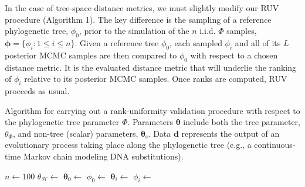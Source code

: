 \documentclass[oneside]{article}
\begin{document}
In the case of tree-space distance metrics, we must slightly modify our RUV procedure (Algorithm 1).
The key difference is the sampling of a reference phylogenetic tree, $\phi_0$, prior to the simulation of the $n$ i.i.d. $\Phi$ samples, $\boldsymbol{\phi}=\{\phi_i: 1 \leq i \leq n\}$.
Given a reference tree $\phi_0$, each sampled $\phi_i$ and all of its $L$ posterior MCMC samples are then compared to $\phi_0$ with respect to a chosen distance metric.
It is the evaluated distance metric that will underlie the ranking of $\phi_i$ relative to its posterior MCMC samples.
Once ranks are computed, RUV proceeds as usual.
   

\begin{algorithm}[h]
  \DontPrintSemicolon
  \caption{Algorithm for carrying out a rank-uniformity validation procedure with respect to the phylogenetic tree parameter $\Phi$.
    Parameters $\boldsymbol{\theta}$ include both the tree parameter, $\theta_\Phi$, and non-tree (scalar) parameters, $\boldsymbol{\theta}_{\text{s}}$.
    Data $\boldsymbol{d}$ represents the output of an evolutionary process taking place along the phylogenetic tree (e.g., a continuous-time Markov chain modeling DNA substitutions).}
  \label{alg:sbcphylo}
  $n \gets 100$\; 
  $\theta_{\mathcal{H}} \gets$ \InitH{}\; 
  $\boldsymbol{\theta}_0 \gets$ \; 
  $\phi_0 \gets$ \; 
   {
    $\boldsymbol{\theta}_i \gets$ \; 
    $\phi_i \gets$ \; 
}
\end{algorithm}
\end{document}

